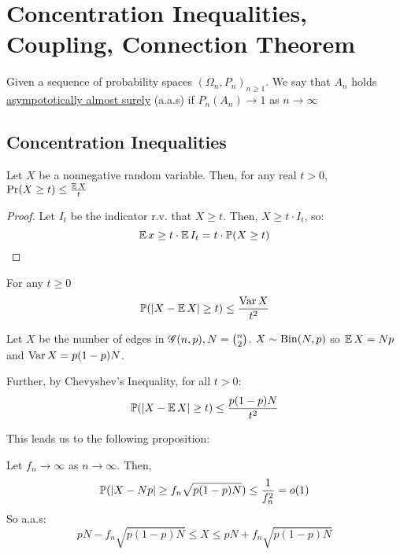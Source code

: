 \section{Concentration Inequalities, Coupling, Connection Theorem}

\begin{definition}
    Given a sequence of probability spaces $(\Omega_n, P_n)_{n \geq 1}$. We say that $A_n$ holds \ul{asympototically almost surely} (a.a.s) if $P_n(A_n) \rightarrow 1$ as $n \rightarrow \infty$
\end{definition}

\subsection{Concentration Inequalities}

\begin{theorem}
    Let $X$ be a nonnegative random variable. Then, for any real $t > 0$, $\Pr(X \geq t) \leq \frac{\operatorname{\mathbb{E}} X}{t}$
\end{theorem}
\begin{proof}
    Let $I_t$ be the indicator r.v. that $X \geq t$.
    Then, $X \geq t\cdot I_t$, so:
    \begin{equation*}
        \operatorname{\mathbb{E}} x \geq t \cdot \operatorname{\mathbb{E}} I_t = t \cdot \operatorname{\mathbb{P}} (X \geq t)
    \end{equation*}
\end{proof}

\begin{theorem}
    For any $t \geq 0$
    \begin{equation*}
        \operatorname{\mathbb{P}} (| X - \operatorname{\mathbb{E}} X | \geq t) \leq \frac{\operatorname{\mathrm{Var}} X}{t^2}
    \end{equation*}
\end{theorem}

\begin{example}
    Let $X$ be the number of edges in $\operatorname{\mathscr{G}}(n, p), N = \binom{n}{2}$.
    $X \sim \operatorname{\mathrm{Bin}}(N, p)$ so $\operatorname{\mathbb{E}} X = Np$ and $\operatorname{\mathrm{Var}} X = p(1 - p)N$.

    Further, by Chevyshev's Inequality, for all $t > 0$:
    \begin{equation*}
        \operatorname{\mathbb{P}}(|X - \operatorname{\mathbb{E}} X| \geq t) \leq \frac{p(1-p)N}{t^2}
    \end{equation*}
\end{example}

This leads us to the following proposition:
\begin{proposition}\label{lec2:num-edges-bound}
    Let $f_n \rightarrow \infty$ as $n \rightarrow \infty$.
    Then,
    \begin{equation*}
        \operatorname{\mathbb{P}}(|X - Np| \geq f_n \sqrt{p(1-p)N}) \leq \frac{1}{f_n^2} = o(1)
    \end{equation*}
    So a.a.s:
    \begin{equation*}
        pN - f_n \sqrt{p(1-p)N} \leq X \leq pN + f_n \sqrt{p(1-p)N}
    \end{equation*}
\end{proposition}

